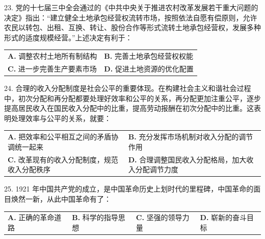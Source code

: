 \documentclass[UTF8,11pt]{ctexart}
\begin{document}
23. 党的十七届三中全会通过的《中共中央关于推进农村改革发展若干重大问题的决定》指出：“建立健全土地承包经营权流转市场，按照依法自愿有偿原则，允许农民以转包、出租、互换、转让、股份合作等形式流转土地承包经营权，发展多种形式的适度规模经营。”上述决定有利于：


\begin{center}\begin{tabular}{>{\raggedright\arraybackslash}p{\dimexpr(\linewidth-4\tabcolsep)/2\relax}>{\raggedright\arraybackslash}p{\dimexpr(\linewidth-4\tabcolsep)/2\relax}}
\textbf{A.} 调整农村土地所有制结构 & \textbf{B.} 完善土地承包经营权权能\\[.35em]
\textbf{C.} 进一步完善生产要素市场 & \textbf{D.} 促进土地资源的优化配置\\[.35em]\end{tabular}\end{center}

24. 合理的收入分配制度是社会公平的重要体现。在构建社会主义和谐社会过程中，初次分配和再分配都要处理好效率和公平的关系，再分配更加注重公平，逐步提高居民收入在国民收入分配中的比重，提高劳动报酬在初次分配中的比重。这表明处理效率与公平的关系，就要：


\begin{center}\begin{tabular}{>{\raggedright\arraybackslash}p{\dimexpr(\linewidth-4\tabcolsep)/2\relax}>{\raggedright\arraybackslash}p{\dimexpr(\linewidth-4\tabcolsep)/2\relax}}
\textbf{A.} 把效率和公平相互之间的矛盾协调统一起来 & \textbf{B.} 充分发挥市场机制对收入分配的调节作用\\[.35em]
\textbf{C.} 改革现有的收入分配制度，规范收入分配秩序 & \textbf{D.} 合理调整国民收入分配格局，加大收入分配调节力度\\[.35em]\end{tabular}\end{center}

25. 1921 年中国共产党的成立，是中国革命历史上划时代的里程碑，中国革命的面目焕然一新，从此中国革命有了：


\begin{center}\begin{tabular}{>{\raggedright\arraybackslash}p{\dimexpr(\linewidth-8\tabcolsep)/4\relax}>{\raggedright\arraybackslash}p{\dimexpr(\linewidth-8\tabcolsep)/4\relax}>{\raggedright\arraybackslash}p{\dimexpr(\linewidth-8\tabcolsep)/4\relax}>{\raggedright\arraybackslash}p{\dimexpr(\linewidth-8\tabcolsep)/4\relax}}
\textbf{A.} 正确的革命道路 & \textbf{B.} 科学的指导思想 & \textbf{C.} 坚强的领导力量 & \textbf{D.} 崭新的奋斗目标\\[.35em]\end{tabular}\end{center}
\end{document}
